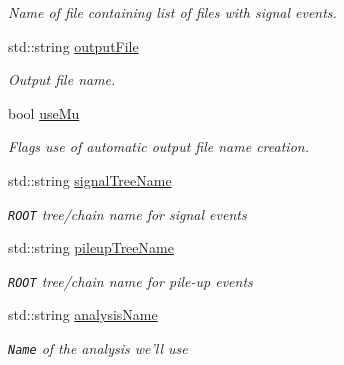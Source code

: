 \begin{CompactItemize}
\begin{CompactList}\small\item\em Name of file containing list of files with signal events. \item\end{CompactList}\item 
std::string \hyperlink{classConfiguration_1_1ConfigData_e750c9a99a34765d813ab55871ea3512}{output\-File}
\begin{CompactList}\small\item\em Output file name. \item\end{CompactList}\item 
bool \hyperlink{classConfiguration_1_1ConfigData_7428762deac046b18b0fdf5abd895696}{use\-Mu}
\begin{CompactList}\small\item\em Flags use of automatic output file name creation. \item\end{CompactList}\item 
\hypertarget{classConfiguration_1_1ConfigData_9179f4b0160625351fc932744652cc0f}{
std::string \hyperlink{classConfiguration_1_1ConfigData_9179f4b0160625351fc932744652cc0f}{signal\-Tree\-Name}}
\label{classConfiguration_1_1ConfigData_9179f4b0160625351fc932744652cc0f}

\begin{CompactList}\small\item\em {\tt ROOT} tree/chain name for signal events \item\end{CompactList}\item 
\hypertarget{classConfiguration_1_1ConfigData_96d3db63c3fd9c00f66defd37263c7df}{
std::string \hyperlink{classConfiguration_1_1ConfigData_96d3db63c3fd9c00f66defd37263c7df}{pileup\-Tree\-Name}}
\label{classConfiguration_1_1ConfigData_96d3db63c3fd9c00f66defd37263c7df}

\begin{CompactList}\small\item\em {\tt ROOT} tree/chain name for pile-up events \item\end{CompactList}\item 
\hypertarget{classConfiguration_1_1ConfigData_4994f8c5250fb546e51d8604ceb0a108}{
std::string \hyperlink{classConfiguration_1_1ConfigData_4994f8c5250fb546e51d8604ceb0a108}{analysis\-Name}}
\label{classConfiguration_1_1ConfigData_4994f8c5250fb546e51d8604ceb0a108}

\begin{CompactList}\small\item\em {\tt Name} of the analysis we'll use \item\end{CompactList}\end{CompactItemize}
